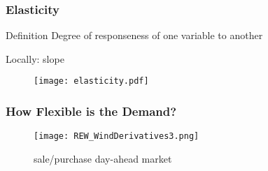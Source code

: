 \documentclass[10pt,aspectratio=169,dvipsnames]{beamer}
\begin{document}
\begin{frame}
 \frametitle{Elasticity}
 \begin{block}{Definition}
  Degree of responseness of one variable to another
 \end{block}
 Locally: slope
     \begin{figure}
     \texttt{[image: elasticity.pdf]}
  \end{figure}

\end{frame}


\begin{frame}
 \frametitle{How Flexible is the Demand?}
    \begin{figure}
     \texttt{[image: REW\_WindDerivatives3.png]}
     \caption{sale/purchase day-ahead market}
  \end{figure}
\end{frame}
\end{document}
